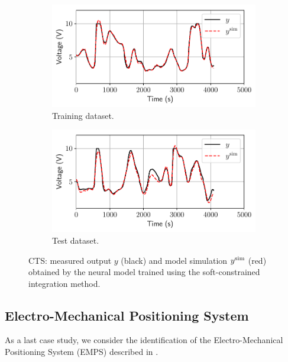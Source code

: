 \documentclass{article} %
\begin{document}
\begin{figure}
\centering
\begin{subfigure}{.5\textwidth}
  \centering
  \includegraphics[width=\linewidth]{fig/CTS/CTS_id_model_SS_soft.pdf}
  \caption{Training dataset.}
  \label{fig:sub1}
\end{subfigure}%
\begin{subfigure}{.5\textwidth}
  \centering
  \includegraphics[width=\linewidth]{fig/CTS/CTS_test_model_SS_soft.pdf}
  \caption{Test dataset.}
  \label{fig:sub2}
\end{subfigure}
\caption{CTS: measured output $y$ (black) and model simulation $y^{\rm sim}$ (red) obtained by the neural model trained using the soft-constrained integration method.} %
\label{fig:CTS_model_SS_custom_consistency.pdf}
\end{figure}



\subsection{Electro-Mechanical Positioning System}
As a last case study, we consider the identification of the Electro-Mechanical Positioning System (EMPS)  described in \citep{janot2019data}. 
\end{document}
